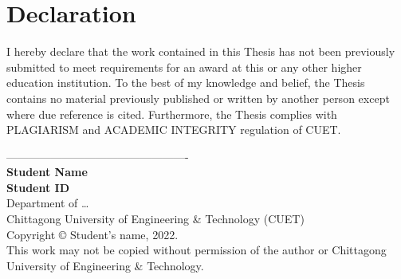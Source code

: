 ﻿\chapter*{Declaration}
I hereby declare that the work contained in this Thesis has not been previously submitted to meet requirements for an award at this or any other higher education institution. To the best of my knowledge and belief, the Thesis contains no material previously published or written by another person except where due reference is cited. Furthermore, the Thesis complies with PLAGIARISM and ACADEMIC INTEGRITY regulation of CUET.

\vspace{2cm}
\noindent
------------------------------------------------- \\
\textbf{Student Name} \\
\textbf{Student ID} \\
Department of \dots \\
Chittagong University of Engineering \& Technology (CUET) \\

\vspace{1cm}
\noindent
Copyright \copyright{} Student's name, 2022. \\
This work may not be copied without permission of the author or Chittagong University of Engineering \& Technology.
